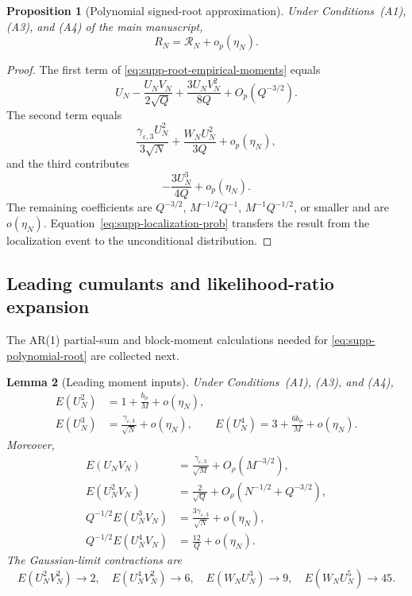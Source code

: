 \documentclass[12pt]{article}
\newtheorem{Proposition}{Proposition}[section]
\newtheorem{Lemma}[Proposition]{Lemma}
\theoremstyle{remark}
\begin{document}
\begin{Proposition}[Polynomial signed-root approximation]
\label{prop:supp-polynomial-root}
Under Conditions~(A1), (A3), and (A4) of the main manuscript,
\[
R_N=\mathcal R_N+o_p(\eta_N).
\]
\end{Proposition}

\begin{proof}
The first term of \eqref{eq:supp-root-empirical-moments} equals
\[
U_N-\frac{U_NV_N}{2\sqrt Q}
+\frac{3U_NV_N^2}{8Q}
+O_p(Q^{-3/2}).
\]
The second term equals
\[
\frac{\gamma_{\varepsilon,3}U_N^2}{3\sqrt N}
+\frac{W_NU_N^2}{3Q}
+o_p(\eta_N),
\]
and the third contributes
\[
-\frac{3U_N^3}{4Q}+o_p(\eta_N).
\]
The remaining coefficients are $Q^{-3/2}$, $M^{-1/2}Q^{-1}$,
$M^{-1}Q^{-1/2}$, or smaller and are $o(\eta_N)$. Equation~\eqref{eq:supp-localization-prob} transfers the result from the localization event to the unconditional distribution.
\end{proof}

\subsection{Leading cumulants and likelihood-ratio expansion}
The AR(1) partial-sum and block-moment calculations needed for
\eqref{eq:supp-polynomial-root} are collected next.

\begin{Lemma}[Leading moment inputs]
\label{lem:supp-leading-moments-ar1}
Under Conditions~(A1), (A3), and (A4),
\begin{align}
E(U_N^2)
&=
1+\frac{b_\phi}{M}+o(\eta_N),
\label{eq:supp-U2}\\
E(U_N^3)
&=
\frac{\gamma_{\varepsilon,3}}{\sqrt N}+o(\eta_N),
\qquad
E(U_N^4)
=
3+\frac{6b_\phi}{M}+o(\eta_N).
\label{eq:supp-U34}
\end{align}
Moreover,
\begin{align*}
E(U_NV_N)
&=
\frac{\gamma_{\varepsilon,3}}{\sqrt M}
+O_\rho(M^{-3/2}),
\\
E(U_N^2V_N)
&=
\frac2{\sqrt Q}
+O_\rho\left(N^{-1/2}+Q^{-3/2}\right),
\\
Q^{-1/2}E(U_N^3V_N)
&=
\frac{3\gamma_{\varepsilon,3}}{\sqrt N}
+o(\eta_N),
\\
Q^{-1/2}E(U_N^4V_N)
&=
\frac{12}{Q}+o(\eta_N).
\end{align*}
The Gaussian-limit contractions are
\[
E(U_N^2V_N^2)\to2,\quad
E(U_N^4V_N^2)\to6,\quad
E(W_NU_N^3)\to9,\quad
E(W_NU_N^5)\to45.
\]
\end{Lemma}
\end{document}
